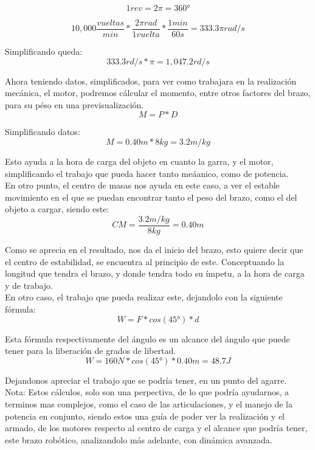 \documentclass[14pt,a4paper]{article}
\begin{document}
$$ 1rev=2\pi=360°$$

$$ 10,000 \frac{vueltas}{min}*\dfrac{2\pi rad}{1 vuelta}*\frac{1 min}{60s}= 333.3 \pi rad/s $$

Simplificando \pi queda:\\

$$ 333.3 rd/s* \pi= 1,047.2 rd/s $$

Ahora teniendo datos, simplificados, para ver como trabajara en la realización mecánica, el motor, podremos cálcular el momento, entre otros factores del brazo, para su péso en una previsualización.\\

$$ M= P*D $$

Simplificando datos:\\

$$ M=0.40m*8kg= 3.2 m/kg $$

Esto ayuda a la hora de carga del objeto en cuanto la garra, y el motor, simplificando el trabajo que pueda hacer tanto meáanico, como de potencia.\\
En otro punto, el centro de masas nos ayuda en este caso, a ver el estable movimiento en el que se puedan encontrar tanto el peso del brazo, como el del objeto a cargar, siendo este:\\

$$ CM=\frac{3.2 m/kg}{8kg}= 0.40m $$

Como se aprecia en el resultado, nos da el inicio del brazo, esto quiere decir que el centro de estabilidad, se encuentra al principio de este. Conceptuando la longitud que tendra el brazo, y donde tendra todo su ímpetu, a la hora de carga y de trabajo.\\
En otro caso, el trabajo que pueda realizar este, dejandolo con la siguiente fórmula:\\

$$ W= F*cos(45°)*d $$

Esta fórmula respectivamente del ángulo es un alcance del ángulo que puede tener para la liberación de grados de libertad.\\

$$ W= 160N*cos(45°)*0.40m= 48.7 J $$

Dejandonos apreciar el trabajo que se podría tener, en un punto del agarre.\\

Nota: Estos cálculos, solo son una perpectiva, de lo que podría ayudarnos, a terminos mas complejos, como el caso de las articulaciones, y el manejo de la potencia en conjunto, siendo estos una guía de poder ver la realización y el armado, de los motores respecto al centro de carga y el alcance que podría tener, este brazo robótico, analizandolo más adelante, con dinámica avanzada.\\
\end{document}
